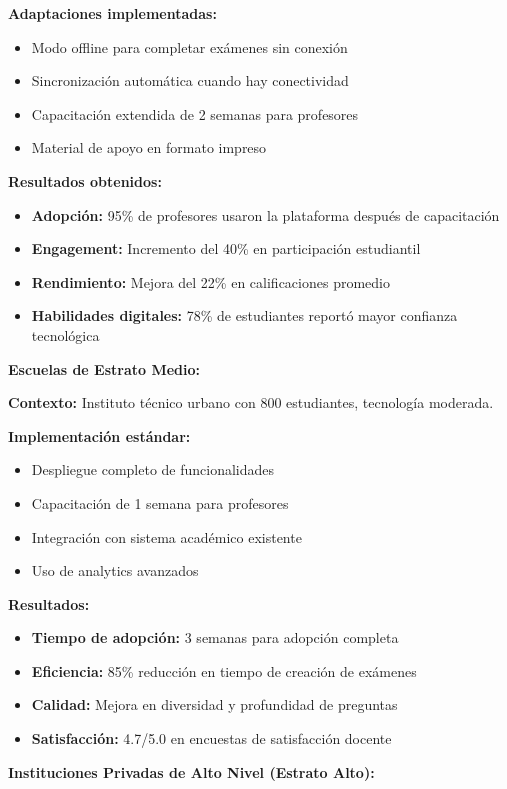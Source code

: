 \documentclass[12pt,a4paper]{report}
\begin{document}
\textbf{Adaptaciones implementadas:}
\begin{itemize}
\item Modo offline para completar exámenes sin conexión
\item Sincronización automática cuando hay conectividad
\item Capacitación extendida de 2 semanas para profesores
\item Material de apoyo en formato impreso
\end{itemize}

\textbf{Resultados obtenidos:}
\begin{itemize}
\item \textbf{Adopción:} 95\% de profesores usaron la plataforma después de capacitación
\item \textbf{Engagement:} Incremento del 40\% en participación estudiantil
\item \textbf{Rendimiento:} Mejora del 22\% en calificaciones promedio
\item \textbf{Habilidades digitales:} 78\% de estudiantes reportó mayor confianza tecnológica
\end{itemize}

\textbf{Escuelas de Estrato Medio:}

\textbf{Contexto:} Instituto técnico urbano con 800 estudiantes, tecnología moderada.

\textbf{Implementación estándar:}
\begin{itemize}
\item Despliegue completo de funcionalidades
\item Capacitación de 1 semana para profesores
\item Integración con sistema académico existente
\item Uso de analytics avanzados
\end{itemize}

\textbf{Resultados:}
\begin{itemize}
\item \textbf{Tiempo de adopción:} 3 semanas para adopción completa
\item \textbf{Eficiencia:} 85\% reducción en tiempo de creación de exámenes
\item \textbf{Calidad:} Mejora en diversidad y profundidad de preguntas
\item \textbf{Satisfacción:} 4.7/5.0 en encuestas de satisfacción docente
\end{itemize}

\textbf{Instituciones Privadas de Alto Nivel (Estrato Alto):}
\end{document}
